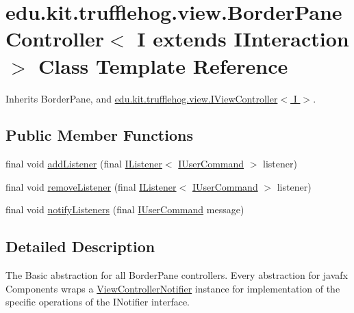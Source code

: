 \hypertarget{classedu_1_1kit_1_1trufflehog_1_1view_1_1_border_pane_controller}{}\section{edu.\+kit.\+trufflehog.\+view.\+Border\+Pane\+Controller$<$ I extends I\+Interaction $>$ Class Template Reference}
\label{classedu_1_1kit_1_1trufflehog_1_1view_1_1_border_pane_controller}


Inherits Border\+Pane, and \hyperlink{interfaceedu_1_1kit_1_1trufflehog_1_1view_1_1_i_view_controller}{edu.\+kit.\+trufflehog.\+view.\+I\+View\+Controller$<$ I $>$}.

\subsection*{Public Member Functions}
\begin{DoxyCompactItemize}
\item 
final void \hyperlink{classedu_1_1kit_1_1trufflehog_1_1view_1_1_border_pane_controller_ab3342124d4cbd8de2abd55616bfe9322}{add\+Listener} (final \hyperlink{interfaceedu_1_1kit_1_1trufflehog_1_1util_1_1_i_listener}{I\+Listener}$<$ \hyperlink{interfaceedu_1_1kit_1_1trufflehog_1_1command_1_1usercommand_1_1_i_user_command}{I\+User\+Command} $>$ listener)
\item 
final void \hyperlink{classedu_1_1kit_1_1trufflehog_1_1view_1_1_border_pane_controller_a55ca580d7380e06f0f082ef1e7aff141}{remove\+Listener} (final \hyperlink{interfaceedu_1_1kit_1_1trufflehog_1_1util_1_1_i_listener}{I\+Listener}$<$ \hyperlink{interfaceedu_1_1kit_1_1trufflehog_1_1command_1_1usercommand_1_1_i_user_command}{I\+User\+Command} $>$ listener)
\item 
final void \hyperlink{classedu_1_1kit_1_1trufflehog_1_1view_1_1_border_pane_controller_a68b4cbedd7c7cce8133206673464b499}{notify\+Listeners} (final \hyperlink{interfaceedu_1_1kit_1_1trufflehog_1_1command_1_1usercommand_1_1_i_user_command}{I\+User\+Command} message)
\end{DoxyCompactItemize}


\subsection{Detailed Description}
The Basic abstraction for all Border\+Pane controllers. Every abstraction for javafx Components wraps a \hyperlink{}{View\+Controller\+Notifier} instance for implementation of the specific operations of the I\+Notifier interface. 


